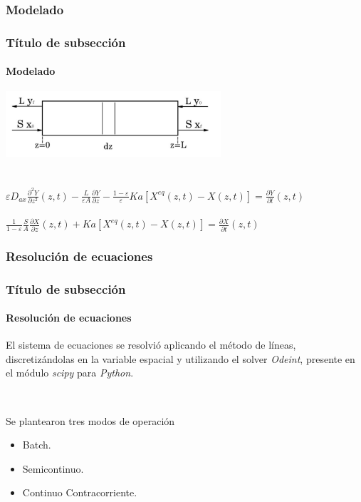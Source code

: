 \documentclass[aspectratio=1610]{beamer}
\newcommand{\ssec}{Título de subsección}
\begin{document}
\subsubsection{Modelado}
\begin{frame}[label=ecs]
	\frametitle{\ssec}
	\framesubtitle{Modelado}
	\begin{center}
	\includegraphics[width=0.6\textwidth]{figs/model-control-volume.png} 
	\\~\\~\\

	$	 
	   \varepsilon D_{ax}\frac{\partial^2Y}{\partial z^2}(z,t)    
	 - \frac{L}{\varepsilon A}\frac{\partial Y}{\partial z}
	 - \frac{1-\varepsilon}{\varepsilon} Ka [X^{eq}(z,t)-X(z,t)] = \frac{\partial Y}{\partial t}(z,t)$
	 \\~\\
	$
	   \frac{1}{1-\varepsilon} \frac{S}{A} \frac{\partial X}{\partial z}(z,t) 
	 + Ka [X^{eq}(z,t) - X(z,t)]
	 = \frac{\partial X}{\partial t}(z,t)
	$
	\end{center}
\end{frame}
\subsubsection{Resolución de ecuaciones}
\begin{frame}
	\frametitle{\ssec}
	\framesubtitle{Resolución de ecuaciones}
	El sistema de ecuaciones se resolvió aplicando el método de líneas,
	discretizándolas en la variable espacial y utilizando el solver \textit{Odeint},
	presente en el módulo \textit{scipy} para \textit{Python}.

	~

	\begin{block}{Se plantearon tres modos de operación}
	\begin{itemize}
	\item Batch.
	\item Semicontinuo.
	\item Continuo Contracorriente.
	\end{itemize}
	\end{block}
\end{frame}
\end{document}
